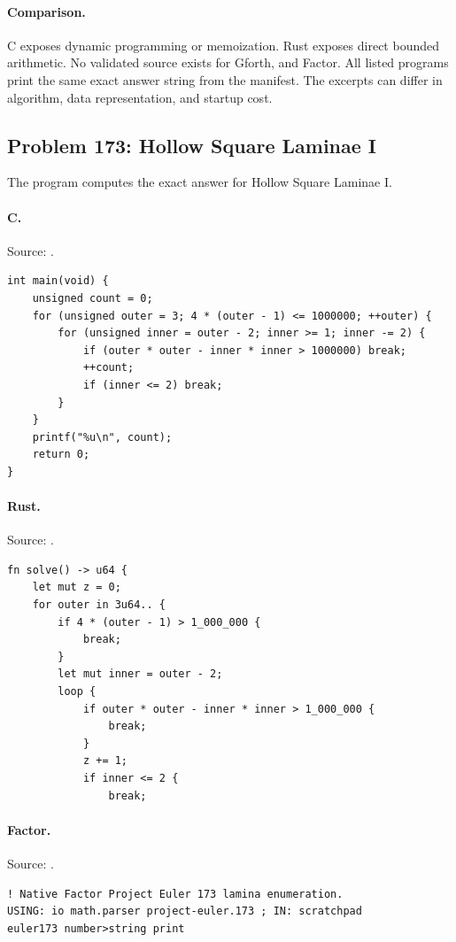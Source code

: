 \paragraph{Comparison.}
C exposes dynamic programming or memoization. Rust exposes direct bounded arithmetic.
No validated source exists for Gforth, and Factor.
All listed programs print the same exact answer string from the manifest. The excerpts can differ in algorithm, data representation, and startup cost.

\subsection{Problem 173: Hollow Square Laminae I}
\label{walkthrough:p173}
The program computes the exact answer for Hollow Square Laminae I.

\paragraph{C.} Source: .
\begin{lstlisting}
int main(void) {
    unsigned count = 0;
    for (unsigned outer = 3; 4 * (outer - 1) <= 1000000; ++outer) {
        for (unsigned inner = outer - 2; inner >= 1; inner -= 2) {
            if (outer * outer - inner * inner > 1000000) break;
            ++count;
            if (inner <= 2) break;
        }
    }
    printf("%u\n", count);
    return 0;
}
\end{lstlisting}

\paragraph{Rust.} Source: .
\begin{lstlisting}
fn solve() -> u64 {
    let mut z = 0;
    for outer in 3u64.. {
        if 4 * (outer - 1) > 1_000_000 {
            break;
        }
        let mut inner = outer - 2;
        loop {
            if outer * outer - inner * inner > 1_000_000 {
                break;
            }
            z += 1;
            if inner <= 2 {
                break;
\end{lstlisting}

\paragraph{Factor.} Source: .
\begin{lstlisting}
! Native Factor Project Euler 173 lamina enumeration.
USING: io math.parser project-euler.173 ; IN: scratchpad
euler173 number>string print
\end{lstlisting}

